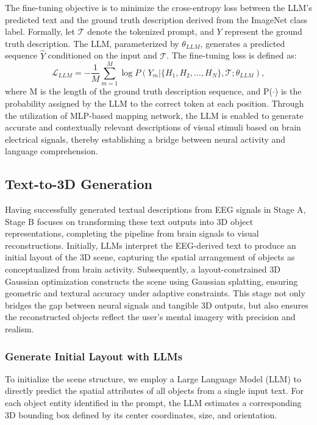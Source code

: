 \documentclass[sigconf]{acmart}
\begin{document}
The fine-tuning objective is to minimize the cross-entropy loss between the LLM's predicted text and the ground truth description derived from the ImageNet class label. Formally, let $\mathcal{T}$ denote the tokenized prompt, and $Y$ represent the ground truth description. The LLM, parameterized by $\theta_{LLM}$, generates a predicted sequence $\hat{Y}$ conditioned on the input and $\mathcal{T}$. The fine-tuning loss is defined as:
\begin{equation}
\mathcal{L}_{LLM} = -\frac{1}{M}\sum_{m=1}^M \log P(Y_m|\{H_1, H_2,\ldots,H_N\}, \mathcal{T}; \theta_{LLM}),
\end{equation}
where M is the length of the ground truth description sequence, and P($\cdot$) is the probability assigned by the LLM to the correct token at each position. Through the utilization of MLP-based mapping network, the LLM is enabled to generate accurate and contextually relevant descriptions of visual stimuli based on brain electrical signals, thereby establishing a bridge between neural activity and language comprehension.

\subsection{Text-to-3D Generation}
Having successfully generated textual descriptions from EEG signals in Stage A, Stage B focuses on transforming these text outputs into 3D object representations, completing the pipeline from brain signals to visual reconstructions. Initially, LLMs interpret the EEG-derived text to produce an initial layout of the 3D scene, capturing the spatial arrangement of objects as conceptualized from brain activity. Subsequently, a layout-constrained 3D Gaussian optimization constructs the scene using Gaussian splatting, ensuring geometric and textural accuracy under adaptive constraints. This stage not only bridges the gap between neural signals and tangible 3D outputs, but also ensures the reconstructed objects reflect the user’s mental imagery with precision and realism. 

\subsubsection*{\textbf{Generate Initial Layout with LLMs}}
To initialize the scene structure, we employ a Large Language Model (LLM) to directly predict the spatial attributes of all objects from a single input text. For each object entity identified in the prompt, the LLM estimates a corresponding 3D bounding box defined by its center coordinates, size, and orientation.
\end{document}
